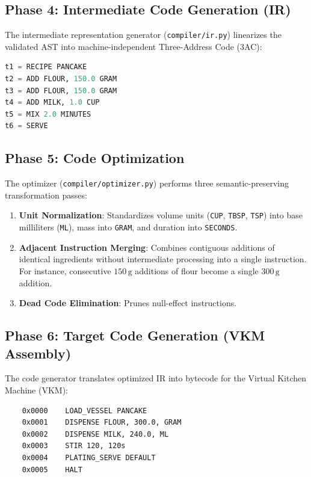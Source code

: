 \documentclass[conference]{IEEEtran}
\begin{document}
\subsection{Phase 4: Intermediate Code Generation (IR)}
The intermediate representation generator (\texttt{compiler/ir.py}) linearizes the validated AST into machine-independent Three-Address Code (3AC):
\begin{lstlisting}[language=Python]
t1 = RECIPE PANCAKE
t2 = ADD FLOUR, 150.0 GRAM
t3 = ADD FLOUR, 150.0 GRAM
t4 = ADD MILK, 1.0 CUP
t5 = MIX 2.0 MINUTES
t6 = SERVE
\end{lstlisting}

\subsection{Phase 5: Code Optimization}
The optimizer (\texttt{compiler/optimizer.py}) performs three semantic-preserving transformation passes:
\begin{enumerate}
    \item \textbf{Unit Normalization}: Standardizes volume units (\texttt{CUP}, \texttt{TBSP}, \texttt{TSP}) into base milliliters (\texttt{ML}), mass into \texttt{GRAM}, and duration into \texttt{SECONDS}.
    \item \textbf{Adjacent Instruction Merging}: Combines contiguous additions of identical ingredients without intermediate processing into a single instruction. For instance, consecutive $150\,\text{g}$ additions of flour become a single $300\,\text{g}$ addition.
    \item \textbf{Dead Code Elimination}: Prunes null-effect instructions.
\end{enumerate}

\subsection{Phase 6: Target Code Generation (VKM Assembly)}
The code generator translates optimized IR into bytecode for the Virtual Kitchen Machine (VKM):
\begin{lstlisting}
    0x0000    LOAD_VESSEL PANCAKE
    0x0001    DISPENSE FLOUR, 300.0, GRAM
    0x0002    DISPENSE MILK, 240.0, ML
    0x0003    STIR 120, 120s
    0x0004    PLATING_SERVE DEFAULT
    0x0005    HALT
\end{lstlisting}
\end{document}
